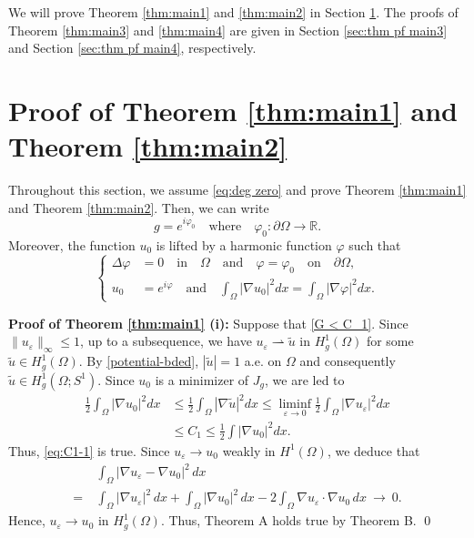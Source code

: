 \documentclass[a4paper,10pt,reqno]{amsart}
\theoremstyle{definition}
\newcommand{\rone}{\mathbb{R}}
\newcommand{\tilu}{{\widetilde u}}
\newcommand{\ve}{{\varepsilon}}
\newcommand{\vp}{{\varphi}}
\newcommand{\Om}{{\Omega}}
\newcommand{\pa}{\partial}
\newcommand{\qand}{{\quad \mbox{and} \quad}}
\newcommand{\qin}{{\quad \mbox{in} \quad}}
\newcommand{\qon}{{\quad \mbox{on} \quad}}
\newcommand{\qwhere}{{\quad \mbox{where} \quad}}
\numberwithin{equation}{section}
\begin{document}
We will prove Theorem \ref{thm:main1} and  \ref{thm:main2} in Section \ref{sec:thm pf main1 first}.
The proofs of Theorem \ref{thm:main3} and \ref{thm:main4} are given in Section \ref{sec:thm pf main3} and Section \ref{sec:thm pf main4}, respectively.

\bigskip
\section{Proof of Theorem \ref{thm:main1} and Theorem \ref{thm:main2}}\label{sec:thm pf main1 first}

Throughout this section, we assume \eqref{eq:deg zero} and prove Theorem \ref{thm:main1} and Theorem \ref{thm:main2}.
Then, we can write
\[ g = e^{i \vp_0} \qwhere \vp_0:  \pa \Om \to \rone.
\]
Moreover, the function $u_0$ is  lifted by a harmonic function $\varphi$   such that
\[ \left\{
\begin{aligned}
\Delta \vp & =0 \qin \Om \qand \vp=\vp_0 \qon \pa \Om,\\
u_0 &= e^{i \varphi} \qand \int_\Omega |\nabla u_0|^2 dx =\int_\Omega |\nabla \vp|^2 dx.
 \end{aligned}
 \right. \]

 \smallskip
{\bf Proof of Theorem \ref{thm:main1} (i): }
Suppose that \eqref{G < C_1}.
Since $\| u_\ve \|_\infty \leq 1$, up to a subsequence, we have
$u_\ve \rightharpoonup \tilde{u}$ in $H_g^1(\Omega)$ for some $\tilu \in H_g^1(\Omega)$.
By \eqref{potential-bded},  $|\tilu | =1$ a.e. on $\Om$ and consequently $ {\tilde{ u}} \in H^1_g(\Om; S^1)$.
Since $u_0$ is a minimizer of $J_g$, we are led to 
\begin{equation}\label{eq:lim-inf}
\begin{aligned}
\frac{1}{2} \int_\Omega |\nabla u_0|^2 dx & \leq \frac{1}{2} \int_\Omega |\nabla \tilde{u}|^2 dx
\leq \liminf_{\ve \to 0}  \frac{1}{2}\int_\Omega |\nabla u_\ve|^2  dx \\
&\leq C_1 \le   \frac{1}{2}\int |\nabla u_0|^2 dx .
\end{aligned}
\end{equation}
Thus, \eqref{eq:C1-1} is true.
Since $u_\ve \to u_0$ weakly in $H^1(\Om)$, we deduce that
\begin{equation}\label{eq:strong conv u to u0}
\begin{aligned}
& \int_\Om |\nabla u_\ve - \nabla u_0|^2 \, dx \\
=~& \int_\Om |\nabla u_\ve |^2 \, dx + \int_\Om |\nabla u_0 |^2 \, dx -2 \int_\Om \nabla u_\ve \cdot \nabla u_0\, dx ~\to ~ 0.
\end{aligned}
\end{equation}
Hence, $u_\ve \to u_0$ in $H_g^1(\Om)$.
Thus, Theorem A holds true by Theorem B.
\qed \\
\smallskip
\end{document}
